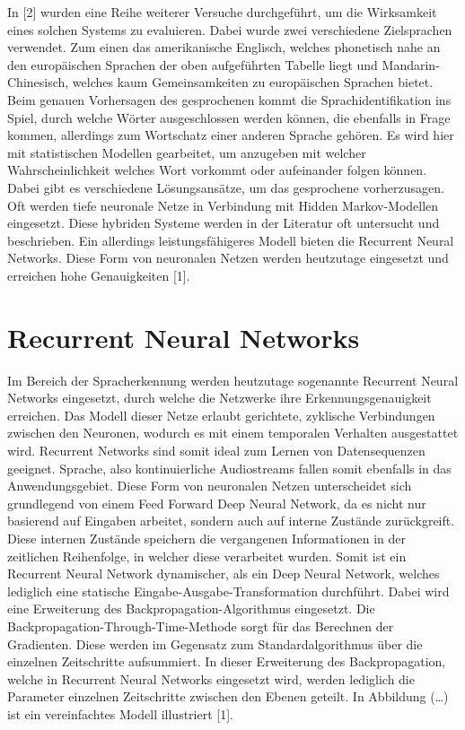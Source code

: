 In [2] wurden eine Reihe weiterer Versuche durchgeführt, um die Wirksamkeit eines solchen Systems zu evaluieren. Dabei wurde zwei verschiedene Zielsprachen verwendet. Zum einen das amerikanische Englisch, welches phonetisch nahe an den europäischen Sprachen der oben aufgeführten Tabelle liegt und Mandarin-Chinesisch, welches kaum Gemeinsamkeiten zu europäischen Sprachen bietet. Beim genauen Vorhersagen des gesprochenen kommt die Sprachidentifikation ins Spiel, durch welche Wörter ausgeschlossen werden können, die ebenfalls in Frage kommen, allerdings zum Wortschatz einer anderen Sprache gehören. Es wird hier mit statistischen Modellen gearbeitet, um anzugeben mit welcher Wahrscheinlichkeit welches Wort vorkommt oder aufeinander folgen können. Dabei gibt es verschiedene Lösungsansätze, um das gesprochene vorherzusagen. Oft werden tiefe neuronale Netze in Verbindung mit Hidden Markov-Modellen eingesetzt. Diese hybriden Systeme werden in der Literatur oft untersucht und beschrieben. Ein allerdings leistungsfähigeres Modell bieten die Recurrent Neural Networks. Diese Form von neuronalen Netzen werden heutzutage eingesetzt und erreichen hohe Genauigkeiten [1].


\section{Recurrent Neural Networks}
Im Bereich der Spracherkennung werden heutzutage sogenannte Recurrent Neural Networks eingesetzt, durch welche die Netzwerke ihre Erkennungsgenauigkeit erreichen. Das Modell dieser Netze erlaubt gerichtete, zyklische Verbindungen zwischen den Neuronen, wodurch es mit einem temporalen Verhalten ausgestattet wird. Recurrent Networks sind somit ideal zum Lernen von Datensequenzen geeignet. Sprache, also kontinuierliche Audiostreams fallen somit ebenfalls in das Anwendungsgebiet. Diese Form von neuronalen Netzen unterscheidet sich grundlegend von einem Feed Forward Deep Neural Network, da es nicht nur basierend auf Eingaben arbeitet, sondern auch auf interne Zustände zurückgreift. Diese internen Zustände speichern die vergangenen Informationen in der zeitlichen Reihenfolge, in welcher diese verarbeitet wurden. Somit ist ein Recurrent Neural Network dynamischer, als ein Deep Neural Network, welches lediglich eine statische Eingabe-Ausgabe-Transformation durchführt. Dabei wird eine Erweiterung des Backpropagation-Algorithmus eingesetzt. Die Backpropagation-Through-Time-Methode sorgt für das Berechnen der Gradienten. Diese werden im Gegensatz zum Standardalgorithmus über die einzelnen Zeitschritte aufsummiert. In dieser Erweiterung des Backpropagation, welche in Recurrent Neural Networks eingesetzt wird, werden lediglich die Parameter einzelnen Zeitschritte zwischen den Ebenen geteilt. In Abbildung (…) ist ein vereinfachtes Modell illustriert [1].

